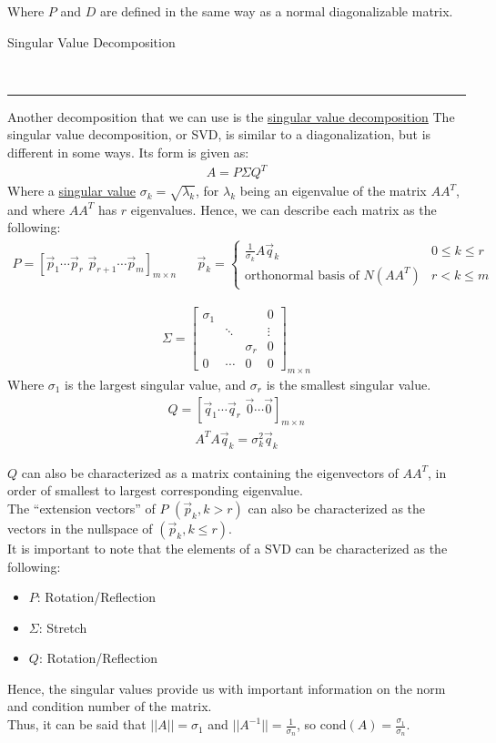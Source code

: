 \documentclass{article}
\newcommand{\header}[1]{\begin{large}\noindent #1\end{large}\\\rule{\textwidth}{0.5pt}}
\newcommand{\gap}{\medskip\\}
\begin{document}
Where $P$ and $D$ are defined in the same way as a normal diagonalizable matrix.
\gap
\header{Singular Value Decomposition}
Another decomposition that we can use is the \underline{singular value decomposition}
The singular value decomposition, or SVD, is similar to a diagonalization, but is
different in some ways. Its form is given as:
\begin{align*}
    A = P\Sigma Q^T 
\end{align*}
Where a \underline{singular value} $\sigma_k = \sqrt{\lambda_k}$, for $\lambda_k$
being an eigenvalue of the matrix $AA^T$, and where $AA^T$ has $r$ eigenvalues. Hence,
we can describe each matrix as the following:
\begin{align*}
    P = [\vec{p}_1 \cdots \vec{p}_r \, \, \vec{p}_{r + 1} \cdots \vec{p}_m]_{m \times n}
&&
    \vec{p}_k = \begin{cases}
        \frac{1}{\sigma_k} A \vec{q}_k & 0 \leq k \leq r\\
        \textrm{orthonormal basis of }N(AA^T) & r < k \leq m
    \end{cases}
\end{align*}

\begin{multicols}{2}
    \begin{align*}
        \Sigma = \begin{bmatrix}
            \sigma_1 & & & 0\\
            & \ddots & & \vdots \\
            & & \sigma_r & 0\\
            0 & \cdots & 0 & 0
        \end{bmatrix}_{m \times n}
    \end{align*}
    Where $\sigma_1$ is the largest singular value, and $\sigma_r$ is the smallest singular value.
    \vfill\null\columnbreak
    \begin{align*}
        Q = [\vec{q}_1 \cdots \vec{q}_r \, \, \vec{0} \cdots \vec{0}]_{m \times n}
    \end{align*}
    \begin{align*}
        A^TA \vec{q}_k = \sigma_k^2 \vec{q}_k
    \end{align*}
    \vfill\null
\end{multicols}
$Q$ can also be characterized as a matrix containing the eigenvectors of $AA^T$,
in order of smallest to largest corresponding eigenvalue.
\gap
The ``extension vectors'' of $P$ $(\vec{p}_k, k > r)$ can also be characterized
as the vectors in the nullspace of $(\vec{p}_k, k \leq r)$. 
\gap
It is important to note that the elements of a SVD can be characterized as the
following:
\begin{itemize}
    \item $P$: Rotation/Reflection
    \item $\Sigma$: Stretch
    \item $Q$: Rotation/Reflection
\end{itemize}
Hence, the singular values provide us with important information on the norm 
and condition number of the matrix. 
\gap
Thus, it can be said that $||A|| = \sigma_1$ and $||A^{-1}|| = \frac{1}{\sigma_n}$,
so $\textrm{cond}(A) = \frac{\sigma_1}{\sigma_n}$.
\end{document}
